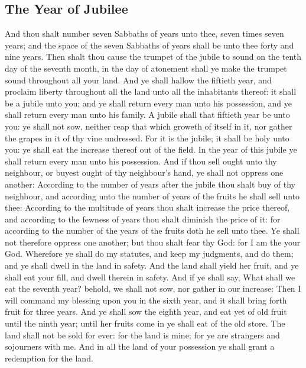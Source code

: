 \begin{biblechapter}
\section*{The Year of Jubilee}
\verse And thou shalt number seven Sabbaths of years unto thee, seven times seven years; and the space of the seven Sabbaths of years shall be unto thee forty and nine years.
\verse Then shalt thou cause the trumpet of the jubile to sound on the tenth day of the seventh month, in the day of atonement shall ye make the trumpet sound throughout all your land.
\verse And ye shall hallow the fiftieth year, and proclaim liberty throughout all the land unto all the inhabitants thereof: it shall be a jubile unto you; and ye shall return every man unto his possession, and ye shall return every man unto his family.
\verse A jubile shall that fiftieth year be unto you: ye shall not sow, neither reap that which groweth of itself in it, nor gather the grapes in it of thy vine undressed.
\verse For it is the jubile; it shall be holy unto you: ye shall eat the increase thereof out of the field.
\verse In the year of this jubile ye shall return every man unto his possession.
\verse And if thou sell ought unto thy neighbour, or buyest ought of thy neighbour's hand, ye shall not oppress one another:
\verse According to the number of years after the jubile thou shalt buy of thy neighbour, and according unto the number of years of the fruits he shall sell unto thee:
\verse According to the multitude of years thou shalt increase the price thereof, and according to the fewness of years thou shalt diminish the price of it: for according to the number of the years of the fruits doth he sell unto thee.
\verse Ye shall not therefore oppress one another; but thou shalt fear thy God: for I am the \LORD your God.
\verse Wherefore ye shall do my statutes, and keep my judgments, and do them; and ye shall dwell in the land in safety.
\verse And the land shall yield her fruit, and ye shall eat your fill, and dwell therein in safety.
\verse And if ye shall say, What shall we eat the seventh year? behold, we shall not sow, nor gather in our increase:
\verse Then I will command my blessing upon you in the sixth year, and it shall bring forth fruit for three years.
\verse And ye shall sow the eighth year, and eat yet of old fruit until the ninth year; until her fruits come in ye shall eat of the old store.
\verse The land shall not be sold for ever: for the land is mine; for ye are strangers and sojourners with me.
\verse And in all the land of your possession ye shall grant a redemption for the land.

\end{biblechapter}
